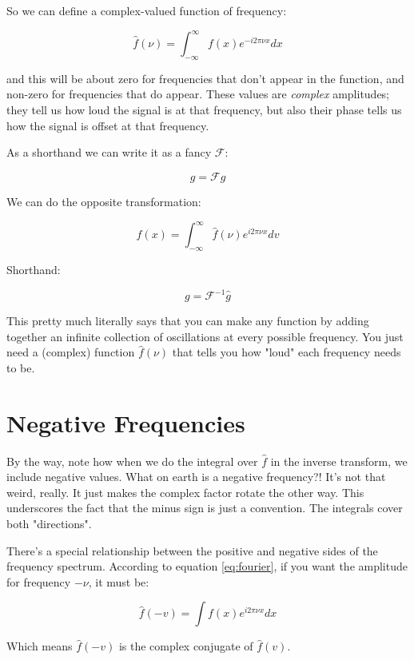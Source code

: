 So we can define a complex-valued function of frequency:

\begin{equation}
    \hat{f}(\nu) = \int_{-\infty}^{\infty} f(x)e^{-i2\pi\nu x} dx
    \label{eq:fourier}
\end{equation}

and this will be about zero for frequencies that don't appear in the function, and non-zero for frequencies that do appear. These values are \textit{complex} amplitudes; they tell us how loud the signal is at that frequency, but also their phase tells us how the signal is offset at that frequency.

As a shorthand we can write it as a fancy $\mathcal{F}$:

$$\hat{g} = \mathcal{F} g$$

We can do the opposite transformation:

\begin{equation}    
f(x) = \int_{-\infty}^{\infty} \hat{f}(\nu)e^{i2\pi\nu x} dv
\label{eq:invfourier}
\end{equation}

Shorthand:

$$g = \mathcal{F}^{-1} \hat{g}$$

This pretty much literally says that you can make any function by adding together an infinite collection of oscillations at every possible frequency. You just need a (complex) function $\hat{f}(\nu)$ that tells you how "loud" each frequency needs to be.

\section{Negative Frequencies}

By the way, note how when we do the integral over $\hat{f}$ in the inverse transform, we include negative values. What on earth is a negative frequency?! It's not that weird, really. It just makes the complex factor rotate the other way. This underscores the fact that the minus sign is just a convention. The integrals cover both "directions".

There's a special relationship between the positive and negative sides of the frequency spectrum. According to equation \ref{eq:fourier}, if you want the amplitude for frequency $-\nu$, it must be:

$$
\hat{f}(-v) = \int f(x)e^{i2\pi\nu x} dx
\label{3}
$$

Which means $\hat{f}(-v)$ is the complex conjugate of $\hat{f}(v)$.

